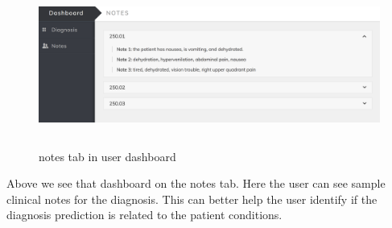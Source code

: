 \documentclass{article}
\begin{document}
\begin{figure}[H]
\begin{center}
\includegraphics[width=\textwidth, height=200px]{notes_sample.png}
\caption{notes tab in user dashboard}
\end{center}
\end{figure}

\noindent Above we see that dashboard  on the notes tab. Here the user can see sample clinical notes for the diagnosis. This can better help the user identify if the diagnosis prediction is related to the patient conditions. 
\end{document}
